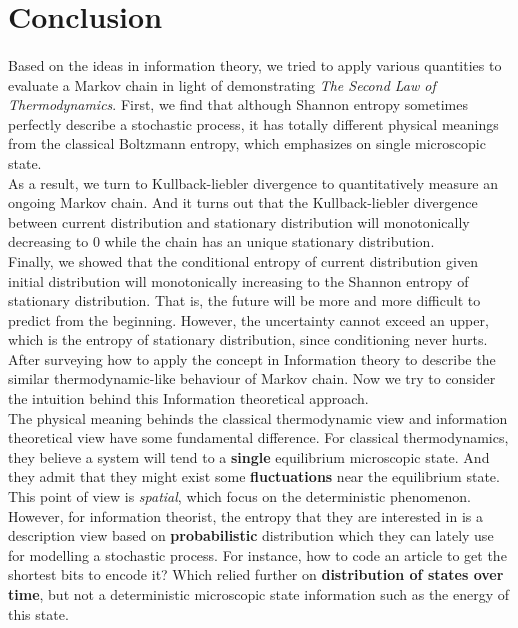 \documentclass[a4paper, 11pt]{article} %
\begin{document}
\section*{Conclusion}
\paragraph{}
Based on the ideas in information theory, we tried to apply various quantities to evaluate a Markov chain in light of demonstrating {\it The Second Law of Thermodynamics}. First, we find that although Shannon entropy sometimes perfectly describe a stochastic process, it has totally different physical meanings from the classical Boltzmann entropy, which emphasizes on single microscopic state.\\

As a result, we turn to Kullback-liebler divergence  to quantitatively measure an ongoing Markov chain. And it turns out that the Kullback-liebler divergence  between current distribution and stationary distribution will monotonically decreasing to 0 while the chain has an unique stationary distribution.\\

Finally, we showed that the conditional entropy of current distribution given initial distribution   will monotonically increasing to the Shannon entropy of stationary distribution. That is, the future will be more and more difficult to predict from the beginning. However, the uncertainty cannot exceed an upper, which is the entropy of stationary distribution, since conditioning never hurts.\\

After surveying how to apply the concept in Information theory to describe the similar thermodynamic-like behaviour of Markov chain. Now we try to consider the intuition behind this Information theoretical approach.\\

The physical meaning behinds the classical thermodynamic view and information theoretical view have some fundamental difference. For classical thermodynamics, they believe a system will tend to a {\bf single} equilibrium microscopic state. And they admit that they might exist some {\bf fluctuations} near the equilibrium state. This point of view is {\it spatial}, which focus on the deterministic phenomenon.\\

However, for information theorist, the entropy that they are interested in is a description view based on {\bf probabilistic} distribution which they can lately use for modelling a stochastic process. For instance, how to code an article to get the shortest bits to encode it? Which relied further on {\bf distribution of states over time}, but not a deterministic microscopic state information such as the energy of this state.\\
 
\end{document}
